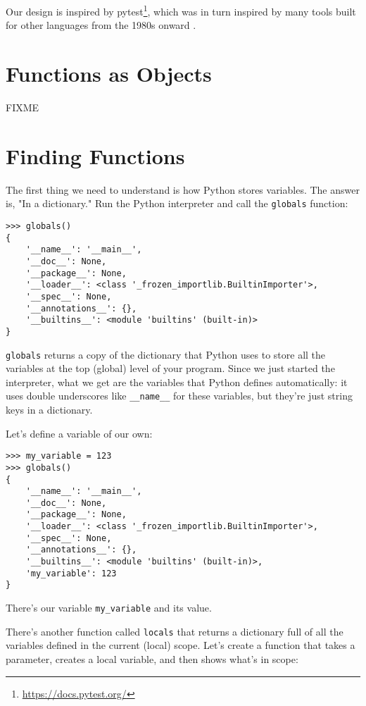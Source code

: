 \documentclass{scrbook}
\newcommand{\hreffoot}[2]{{#1}\footnote{\href{#2}{#2}}}
\begin{document}
Our design is inspired by \hreffoot{pytest}{https://docs.pytest.org/},
which was in turn inspired by many tools built for other languages
from the 1980s onward \cite{Meszaros2007}.

\section{Functions as Objects}\label{tester-funcobj}


FIXME

\section{Finding Functions}\label{tester-reflection}


The first thing we need to understand is how Python stores variables.
The answer is, "In a dictionary."
Run the Python interpreter and call the \texttt{globals} function:

\begin{lstlisting}[frame=single,frameround=tttt]
>>> globals()
{
    '__name__': '__main__',
    '__doc__': None,
    '__package__': None,
    '__loader__': <class '_frozen_importlib.BuiltinImporter'>,
    '__spec__': None,
    '__annotations__': {},
    '__builtins__': <module 'builtins' (built-in)>
}
\end{lstlisting}


\texttt{globals} returns a copy of the dictionary that Python uses
to store all the variables at the top (global) level of your program.
Since we just started the interpreter,
what we get are the variables that Python defines automatically:
it uses double underscores like \texttt{\_\_name\_\_} for these variables,
but they're just string keys in a dictionary.


Let's define a variable of our own:

\begin{lstlisting}[frame=single,frameround=tttt]
>>> my_variable = 123
>>> globals()
{
    '__name__': '__main__',
    '__doc__': None,
    '__package__': None,
    '__loader__': <class '_frozen_importlib.BuiltinImporter'>,
    '__spec__': None,
    '__annotations__': {},
    '__builtins__': <module 'builtins' (built-in)>,
    'my_variable': 123
}
\end{lstlisting}


There's our variable \texttt{my\_variable} and its value.


There's another function called \texttt{locals} that returns a dictionary full of
all the variables defined in the current (local) scope.
Let's create a function that takes a parameter,
creates a local variable,
and then shows what's in scope:
\end{document}
